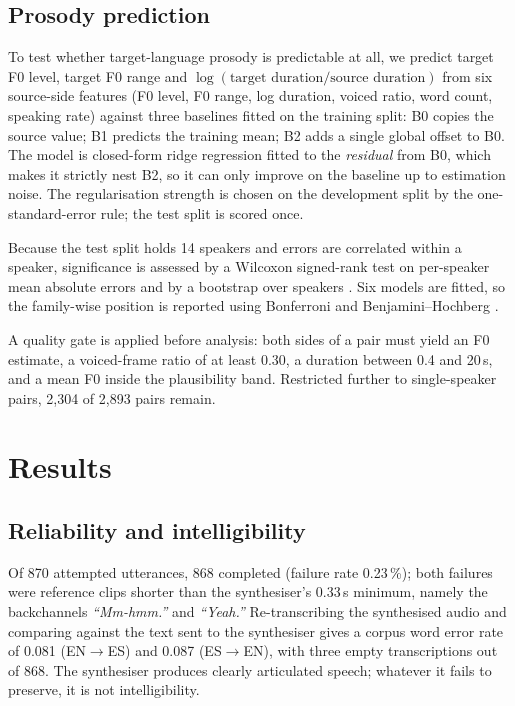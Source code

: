 \documentclass[journal]{IEEEtran}
\newcommand{\ento}{EN$\rightarrow$ES}
\newcommand{\esto}{ES$\rightarrow$EN}
\begin{document}
\subsection{Prosody prediction}
To test whether target-language prosody is predictable at all, we predict target F0 level, target
F0 range and $\log(\text{target duration}/\text{source duration})$ from six source-side features
(F0 level, F0 range, log duration, voiced ratio, word count, speaking rate) against three
baselines fitted on the training split: B0 copies the source value; B1 predicts the training mean;
B2 adds a single global offset to B0. The model is closed-form ridge regression
\cite{hoerl1970ridge} fitted to the \emph{residual} from B0, which makes it strictly nest B2, so it
can only improve on the baseline up to estimation noise. The regularisation strength is chosen on
the development split by the one-standard-error rule; the test split is scored once.

Because the test split holds 14 speakers and errors are correlated within a speaker, significance
is assessed by a Wilcoxon signed-rank test \cite{wilcoxon1945} on per-speaker mean absolute errors
and by a bootstrap over speakers \cite{efron1993bootstrap}. Six models are fitted, so the
family-wise position is reported using Bonferroni and Benjamini--Hochberg \cite{benjamini1995fdr}.

A quality gate is applied before analysis: both sides of a pair must yield an F0 estimate, a
voiced-frame ratio of at least 0.30, a duration between 0.4 and 20\,s, and a mean F0 inside the
plausibility band. Restricted further to single-speaker pairs, 2{,}304 of 2{,}893 pairs remain.

\section{Results}

\subsection{Reliability and intelligibility}
Of 870 attempted utterances, 868 completed (failure rate 0.23\,\%); both failures were reference
clips shorter than the synthesiser's 0.33\,s minimum, namely the backchannels \emph{``Mm-hmm.''} and
\emph{``Yeah.''} Re-transcribing the synthesised audio and comparing against the text sent to the
synthesiser gives a corpus word error rate of 0.081 (\ento) and 0.087 (\esto), with three empty
transcriptions out of 868. The synthesiser produces clearly articulated speech; whatever it fails to
preserve, it is not intelligibility.
\end{document}
